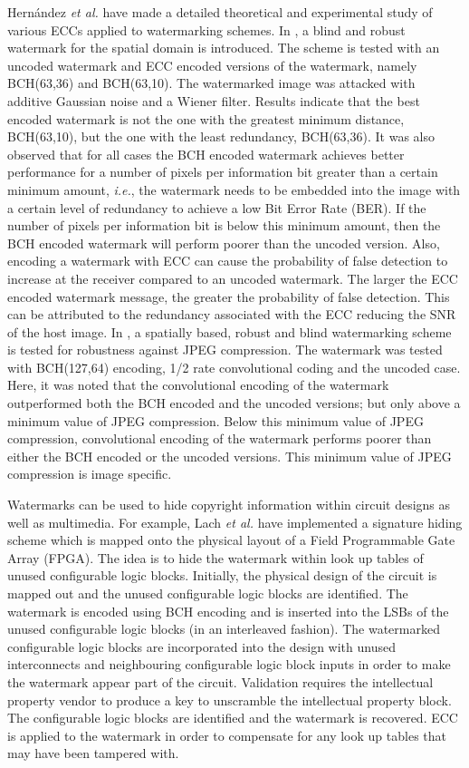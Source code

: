 \documentclass[12pt]{report}
\begin{document}
Hern\'andez \emph{et al.} \cite{ECCb4:th1, ECCb4:th3, ECCb4:th4, ECCb4:th5, ECCb4:th6} have made a detailed theoretical and experimental study of various 
ECCs applied to watermarking schemes.
In \cite{ECCb4:th3, ECCb4:th4, ECCb4:th5}, a blind and robust watermark for the spatial domain is introduced. 
The scheme is tested with an uncoded watermark and ECC encoded versions of the watermark, namely BCH(63,36) and BCH(63,10).
The watermarked image was attacked with additive Gaussian noise and a Wiener filter.
Results indicate that the best encoded watermark is not the one with the greatest minimum distance, BCH(63,10), 
but the one with the least redundancy, BCH(63,36).
It was also observed that for all cases the BCH encoded watermark achieves better performance for a number of pixels
per information bit greater than a certain minimum amount, \emph{i.e.}, the watermark needs to be embedded into the image
with a certain level of redundancy to achieve a low Bit Error Rate (BER). If the number of pixels
per information bit is below this minimum amount, then the BCH encoded watermark will perform poorer than the uncoded version.
Also, encoding a watermark with ECC can cause the probability of false detection to increase at the receiver compared to
an uncoded watermark. The larger the ECC encoded watermark message, the greater the probability of false detection.
This can be attributed to the redundancy associated with the ECC reducing the SNR of the host image.
In \cite{ECCb4:th6}, a spatially based, robust and blind watermarking scheme is tested for robustness against JPEG compression.
The watermark was tested with BCH(127,64) encoding, 1/2 rate convolutional coding and the uncoded case. Here, it was noted 
that the convolutional encoding of the watermark outperformed both the BCH encoded and the uncoded versions; but only above
a minimum value of JPEG compression. Below this minimum value of JPEG compression, convolutional encoding of the watermark 
performs poorer than either the BCH encoded or the uncoded versions. This minimum value of JPEG compression is image specific.

Watermarks can be used to hide copyright information within circuit designs as well as multimedia. For example,
Lach \emph{et al.} \cite{ECCb4:fpga} have implemented a signature hiding scheme which is mapped onto the physical
layout of a Field Programmable Gate Array (FPGA). The idea is to hide the watermark within look up tables of unused
configurable logic blocks.
Initially, the physical design of the circuit is mapped out and the unused configurable logic blocks are
identified. The watermark is encoded using BCH encoding and is inserted into the LSBs of the unused
configurable logic blocks (in an interleaved fashion).
The watermarked configurable logic blocks are incorporated into the design
with unused interconnects and neighbouring configurable logic block inputs in order to make the watermark appear part of the circuit.
Validation requires the intellectual property vendor to produce a key to unscramble the intellectual property block. The
configurable logic blocks are
identified and the watermark is recovered. ECC is applied to the watermark in order to compensate for any look up tables
that may have been tampered with.
\end{document}
